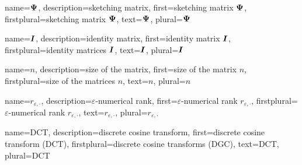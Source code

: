 {%
  name={$\boldsymbol{\Psi}$},%
  description={sketching matrix},%
  first={sketching matrix $\boldsymbol{\Psi}$},%
  firstplural={sketching matrix $\boldsymbol{\Psi}$},%
  text={$\boldsymbol{\Psi}$},%
  plural={$\boldsymbol{\Psi}$}%
}

{%
  name={$\boldsymbol{I}$},%
  description={identity matrix},%
  first={identity matrix $\boldsymbol{I}$},%
  firstplural={identity matrices $\boldsymbol{I}$},%
  text={$\boldsymbol{I}$},%
  plural={$\boldsymbol{I}$}%
}

{%
  name={$n$},%
  description={size of the matrix},%
  first={size of the matrix $n$},%
  firstplural={size of the matrices $n$},%
  text={$n$},%
  plural={$n$}%
}

{%
  name={$r_{\varepsilon, \cdot}$},%
  description={$\varepsilon$-numerical rank},%
  first={$\varepsilon$-numerical rank $r_{\varepsilon, \cdot}$},%
  firstplural={$\varepsilon$-numerical rank $r_{\varepsilon, \cdot}$},%
  text={$r_{\varepsilon, \cdot}$},%
  plural={$r_{\varepsilon, \cdot}$}%
}

{%
  name={DCT},%
  description={discrete cosine transform},%
  first={discrete cosine transform (DCT)},%
  firstplural={discrete cosine transforms (DGC)},%
  text={DCT},%
  plural={DCT}%
}